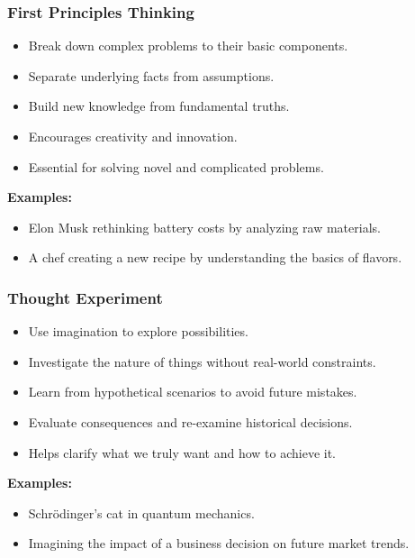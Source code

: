 \begin{frame}[fragile]\frametitle{First Principles Thinking}
\begin{itemize}
    \item Break down complex problems to their basic components.
    \item Separate underlying facts from assumptions.
    \item Build new knowledge from fundamental truths.
    \item Encourages creativity and innovation.
    \item Essential for solving novel and complicated problems.
\end{itemize}
\textbf{Examples:}
\begin{itemize}
    \item Elon Musk rethinking battery costs by analyzing raw materials.
    \item A chef creating a new recipe by understanding the basics of flavors.
\end{itemize}
\end{frame}

\begin{frame}[fragile]\frametitle{Thought Experiment}
\begin{itemize}
    \item Use imagination to explore possibilities.
    \item Investigate the nature of things without real-world constraints.
    \item Learn from hypothetical scenarios to avoid future mistakes.
    \item Evaluate consequences and re-examine historical decisions.
    \item Helps clarify what we truly want and how to achieve it.
\end{itemize}
\textbf{Examples:}
\begin{itemize}
    \item Schrödinger's cat in quantum mechanics.
    \item Imagining the impact of a business decision on future market trends.
\end{itemize}
\end{frame}

